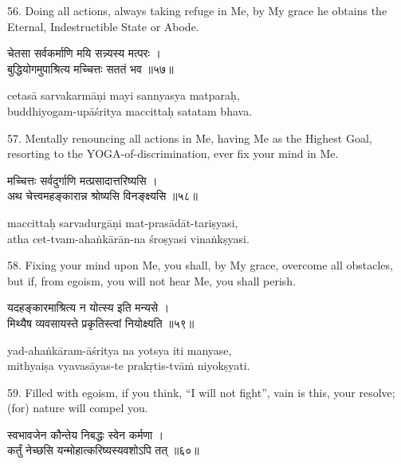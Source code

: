 56. Doing all actions, always taking refuge in Me, by My grace he obtains the
Eternal, Indestructible State or Abode.

\begin{gitaverse}
चेतसा सर्वकर्माणि मयि सन्न्यस्य मत्परः । \\
बुद्धियोगमुपाश्रित्य मच्चित्तः सततं भव ॥५७॥
\end{gitaverse}

\begin{transliteration}
cetasā sarvakarmāṇi mayi sannyasya matparaḥ, \\
buddhiyogam-upāśritya maccittaḥ satatam bhava.
\end{transliteration}

57. Mentally renouncing all actions in Me, having Me as the Highest Goal,
resorting to the YOGA-of-discrimination, ever fix your mind in Me.

\begin{gitaverse}
मच्चित्तः सर्वदुर्गाणि मत्प्रसादात्तरिष्यसि । \\
अथ चेत्त्वमहङ्कारान्न श्रोष्यसि विनङ्क्ष्यसि ॥५८॥
\end{gitaverse}

\begin{transliteration}
maccittaḥ sarvadurgāṇi mat-prasādāt-tariṣyasi, \\
atha cet-tvam-ahaṅkārān-na śroṣyasi vinaṅkṣyasi.
\end{transliteration}

58. Fixing your mind upon Me, you shall, by My grace, overcome all obstacles,
but if, from egoism, you will not hear Me, you shall perish.

\begin{gitaverse}
यदहङ्कारमाश्रित्य न योत्स्य इति मन्यसे । \\
मिथ्यैष व्यवसायस्ते प्रकृतिस्त्वां नियोक्ष्यति ॥५९॥
\end{gitaverse}

\begin{transliteration}
yad-ahaṅkāram-āśritya na yotsya iti manyase, \\
mithyaiṣa vyavasāyas-te prakṛtis-tvāṁ niyokṣyati.
\end{transliteration}

59. Filled with egoism, if you think, ``I will not fight'', vain is this, your
resolve; (for) nature will compel you.

\begin{gitaverse}
स्वभावजेन कौन्तेय निबद्धः स्वेन कर्मणा । \\
कर्तुं नेच्छसि यन्मोहात्करिष्यस्यवशोऽपि तत् ॥६०॥
\end{gitaverse}


